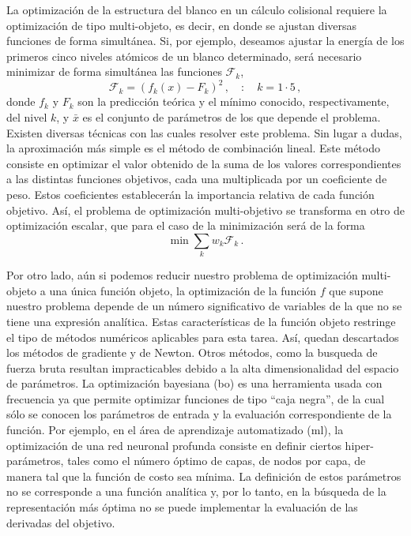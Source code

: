 La optimización de la estructura del blanco en un cálculo colisional 
requiere la optimización de tipo multi-objeto, es decir, en donde se 
ajustan diversas funciones de forma simultánea. Si, por ejemplo, deseamos 
ajustar la energía de los primeros cinco niveles atómicos de un blanco 
determinado, será necesario minimizar de forma simultánea las funciones 
$\mathcal{F}_k$, 
\begin{equation}
\mathcal{F}_k = (f_k(x)-F_k)^2\,,\quad:\quad k=1\cdot 5\,,
\end{equation}
donde $f_k$ y $F_k$ son la predicción teórica y el mínimo conocido, 
respectivamente, del nivel $k$, y $\bar{x}$ es el conjunto de parámetros 
de los que depende el problema. Existen diversas técnicas con las cuales 
resolver este problema. Sin lugar a dudas, la aproximación más simple es 
el método de combinación lineal. Este método consiste en optimizar el 
valor obtenido de la suma de los valores correspondientes a las distintas 
funciones objetivos, cada una multiplicada por un coeficiente de peso.
Estos coeficientes establecerán la importancia relativa de cada función 
objetivo. Así, el problema de optimización multi-objetivo se transforma 
en otro de optimización escalar, que para el caso de la minimización será 
de la forma
\begin{equation}
\min\sum_k w_k \mathcal{F}_k\,.
\end{equation}

Por otro lado, aún si podemos reducir nuestro problema de optimización 
multi-objeto a una única función objeto, la optimización de la función 
$f$ que supone nuestro problema depende de un número significativo de 
variables de la que no se tiene una expresión analítica. Estas 
características de la función objeto restringe el tipo de métodos 
numéricos aplicables para esta tarea. Así, quedan descartados los métodos 
de gradiente y de Newton. Otros métodos, como la busqueda de fuerza bruta 
resultan impracticables debido a la alta dimensionalidad del espacio de 
parámetros. La optimización bayesiana (\acs{bo}) es una herramienta usada 
con frecuencia ya que permite optimizar funciones de tipo ``caja negra'', 
de la cual sólo se conocen los parámetros de entrada y la evaluación 
correspondiente de la función. Por ejemplo, en el área de aprendizaje 
automatizado (\acs{ml}), la optimización de una red neuronal profunda 
consiste en definir ciertos hiper-parámetros, tales como el número óptimo 
de capas, de nodos por capa, de manera tal que la función de costo sea 
mínima. La definición de estos parámetros no se corresponde a una función 
analítica y, por lo tanto, en la búsqueda de la representación más óptima 
no se puede implementar la evaluación de las derivadas del objetivo. 

